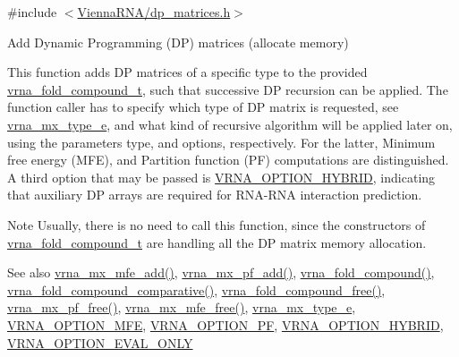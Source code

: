 {\ttfamily \#include $<$\mbox{\hyperlink{dp__matrices_8h}{Vienna\+R\+N\+A/dp\+\_\+matrices.\+h}}$>$}



Add Dynamic Programming (DP) matrices (allocate memory) 

This function adds DP matrices of a specific type to the provided \mbox{\hyperlink{group__fold__compound_ga1b0cef17fd40466cef5968eaeeff6166}{vrna\+\_\+fold\+\_\+compound\+\_\+t}}, such that successive DP recursion can be applied. The function caller has to specify which type of DP matrix is requested, see \mbox{\hyperlink{group__dp__matrices_ga6042ea1d58d01931e959791be6d89343}{vrna\+\_\+mx\+\_\+type\+\_\+e}}, and what kind of recursive algorithm will be applied later on, using the parameters type, and options, respectively. For the latter, Minimum free energy (M\+FE), and Partition function (PF) computations are distinguished. A third option that may be passed is \mbox{\hyperlink{group__fold__compound_ga8f681fa12b8d4b348bf58415fd1fc82f}{V\+R\+N\+A\+\_\+\+O\+P\+T\+I\+O\+N\+\_\+\+H\+Y\+B\+R\+ID}}, indicating that auxiliary DP arrays are required for R\+N\+A-\/\+R\+NA interaction prediction.

\begin{DoxyNote}{Note}
Usually, there is no need to call this function, since the constructors of \mbox{\hyperlink{group__fold__compound_ga1b0cef17fd40466cef5968eaeeff6166}{vrna\+\_\+fold\+\_\+compound\+\_\+t}} are handling all the DP matrix memory allocation.
\end{DoxyNote}
\begin{DoxySeeAlso}{See also}
\mbox{\hyperlink{group__dp__matrices_ga0b29f2a8a5632879014a80d51b334374}{vrna\+\_\+mx\+\_\+mfe\+\_\+add()}}, \mbox{\hyperlink{group__dp__matrices_gaf80ade1ec97fc158875736e69eff999f}{vrna\+\_\+mx\+\_\+pf\+\_\+add()}}, \mbox{\hyperlink{group__fold__compound_ga6601d994ba32b11511b36f68b08403be}{vrna\+\_\+fold\+\_\+compound()}}, \mbox{\hyperlink{group__fold__compound_gad6bacc816af274922b13d947f708aa0c}{vrna\+\_\+fold\+\_\+compound\+\_\+comparative()}}, \mbox{\hyperlink{group__fold__compound_gadded6039d63f5d6509836e20321534ad}{vrna\+\_\+fold\+\_\+compound\+\_\+free()}}, \mbox{\hyperlink{group__dp__matrices_ga2283e69fd139fb8e58d7ade3b5773f9c}{vrna\+\_\+mx\+\_\+pf\+\_\+free()}}, \mbox{\hyperlink{group__dp__matrices_ga6a9422feb5dfe5c64050cebf447672d0}{vrna\+\_\+mx\+\_\+mfe\+\_\+free()}}, \mbox{\hyperlink{group__dp__matrices_ga6042ea1d58d01931e959791be6d89343}{vrna\+\_\+mx\+\_\+type\+\_\+e}}, \mbox{\hyperlink{group__fold__compound_gae63be9127fe7dcc1f9bb14f5bb1064ee}{V\+R\+N\+A\+\_\+\+O\+P\+T\+I\+O\+N\+\_\+\+M\+FE}}, \mbox{\hyperlink{group__fold__compound_gabfbadcddda3e74ce7f49035ef8f058f7}{V\+R\+N\+A\+\_\+\+O\+P\+T\+I\+O\+N\+\_\+\+PF}}, \mbox{\hyperlink{group__fold__compound_ga8f681fa12b8d4b348bf58415fd1fc82f}{V\+R\+N\+A\+\_\+\+O\+P\+T\+I\+O\+N\+\_\+\+H\+Y\+B\+R\+ID}}, \mbox{\hyperlink{group__fold__compound_ga61469c423131552c8483229f8b6c7e0e}{V\+R\+N\+A\+\_\+\+O\+P\+T\+I\+O\+N\+\_\+\+E\+V\+A\+L\+\_\+\+O\+N\+LY}}
\end{DoxySeeAlso}

